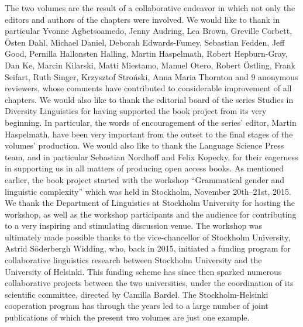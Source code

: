 \documentclass[output=collectionpaper]{langsci/langscibook}
\begin{document}
The two volumes are the result of a collaborative endeavor in which not only the editors and authors of the chapters were involved. We would like to thank in particular Yvonne Agbetsoamedo, Jenny Audring, Lea Brown, Greville Corbett, Östen Dahl, Michael Daniel, Deborah Edwards-Fumey, Sebastian Fedden, Jeff Good, Pernilla Hallonsten Halling, Martin Haspelmath, Robert Hepburn-Gray, Dan Ke, Marcin Kilarski, Matti Miestamo, Manuel Otero, Robert Östling, Frank Seifart, Ruth Singer, Krzysztof Stroński, Anna Maria Thornton and 9 anonymous reviewers, whose comments have contributed to considerable improvement of all chapters. We would also like to thank the editorial board of the series Studies in Diversity Linguistics for having supported the book project from its very beginning. In particular, the words of encouragement of the series’ editor, Martin Haspelmath, have been very important from the outset to the final stages of the volumes’ production. We would also like to thank the Language Science Press team, and in particular Sebastian Nordhoff and Felix Kopecky, for their eagerness in supporting us in all matters of producing open access books. As mentioned earlier, the book project started with the workshop ``Grammatical gender and linguistic complexity'' which was held in Stockholm, November 20th--21st, 2015. We thank the Department of Linguistics at Stockholm University for hosting the workshop, as well as the workshop participants and the audience for contributing to a very inspiring and stimulating discussion venue. The workshop was ultimately made possible thanks to the vice-chancellor of Stockholm University, Astrid Söderbergh Widding, who, back in 2015, initiated a funding program for collaborative linguistics research between Stockholm University and the University of Helsinki. This funding scheme has since then sparked numerous collaborative projects between the two universities, under the coordination of its scientific committee, directed by Camilla Bardel. The Stockholm-Helsinki cooperation program has through the years led to a large number of joint publications of which the present two volumes are just one example.

{\sloppy
\printbibliography[heading=subbibliography,notkeyword=this]
}
\end{document}
